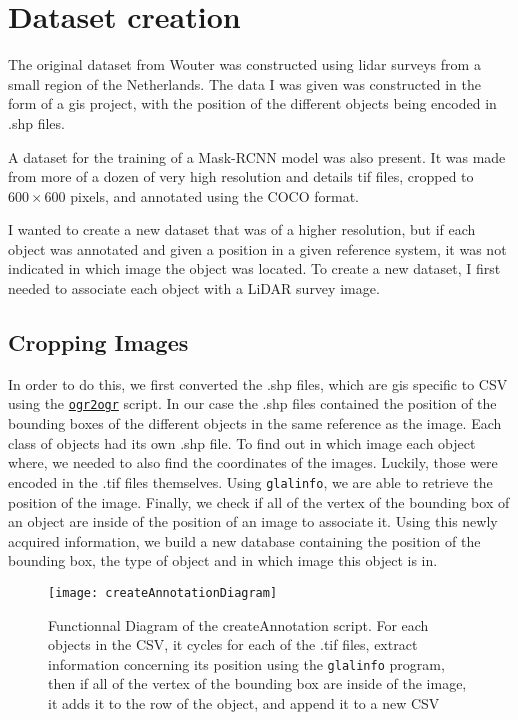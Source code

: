 \section{Dataset creation}%
The original dataset from Wouter\cite{wouter2019} was constructed using \gls{lidar} surveys from a small region of the Netherlands. The data I was given was constructed in the form of a \gls{gis} project, with the position of the different objects being encoded in .shp files. 

A dataset for the training of a Mask-RCNN\cite{maskrcnn} model was also present. It was made from more of a dozen of very high resolution and details tif files, cropped to $600 \times 600$ pixels, and annotated using the COCO\cite{msCOCO} format.

I wanted to create a new dataset that was of a higher resolution, but if each object was annotated and given a position in a given reference system, it was not indicated in which image the object was located. To create a new dataset, I first needed to associate each object with a LiDAR survey image. 

\subsection{Cropping Images}
In order to do this, we first converted the .shp files, which are \gls{gis} specific to CSV using the \href{https://gdal.org/programs/ogr2ogr.html}{\texttt{ogr2ogr}} script. In our case the .shp files contained the position of the bounding boxes of the different objects in the same reference as the image. Each class of objects had its own .shp file. To find out in which image each object where, we needed to also find the coordinates of the images. Luckily, those were encoded in the .tif files themselves. Using \texttt{glalinfo}, we are able to retrieve the position of the image. Finally, we check if all of the vertex of the bounding box of an object are inside of the position of an image to associate it. Using this newly acquired information, we build a new database containing the position of the bounding box, the type of object and in which image this object is in.

\begin{figure}[h!]
  \centering
	\texttt{[image: createAnnotationDiagram]}
	\caption[Functionnal Diagram of the createAnnotation script]{Functionnal Diagram of the createAnnotation script. For each objects in the CSV, it cycles for each of the .tif files, extract information concerning its position using the \texttt{glalinfo} program, then if all of the vertex of the bounding box are inside of the image, it adds it to the row of the object, and append it to a new CSV}
  \label{fig:annotationScript}
\end{figure}

